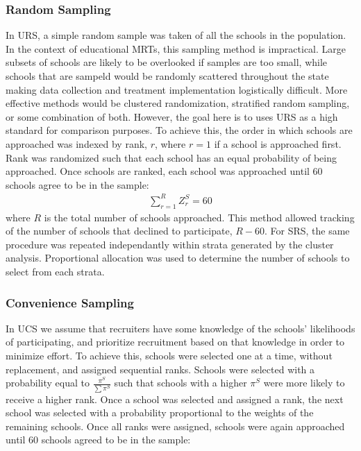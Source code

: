 \documentclass[man,floatsintext]{apa6}
\theoremstyle{definition}
\theoremstyle{definition}
\theoremstyle{definition}
\theoremstyle{remark}
\begin{document}
\hypertarget{random-sampling}{%
\subsubsection{Random Sampling}\label{random-sampling}}

In URS, a simple random sample was taken of all the schools in the
population. In the context of educational MRTs, this sampling method is
impractical. Large subsets of schools are likely to be overlooked if
samples are too small, while schools that are sampeld would be randomly
scattered throughout the state making data collection and treatment
implementation logistically difficult. More effective methods would be
clustered randomization, stratified random sampling, or some combination
of both. However, the goal here is to uses URS as a high standard for
comparison purposes. To achieve this, the order in which schools are
approached was indexed by rank, \(r\), where \(r = 1\) if a school is
approached first. Rank was randomized such that each school has an equal
probability of being approached. Once schools are ranked, each school
was approached until 60 schools agree to be in the sample:
\begin{align} \label{eq:rankRS}
  \sum_{r=1}^R{Z^S_r} = 60
\end{align} where \(R\) is the total number of schools approached. This
method allowed tracking of the number of schools that declined to
participate, \(R - 60\). For SRS, the same procedure was repeated
independantly within strata generated by the cluster analysis.
Proportional allocation was used to determine the number of schools to
select from each strata.

\hypertarget{convenience-sampling}{%
\subsubsection{Convenience Sampling}\label{convenience-sampling}}

In UCS we assume that recruiters have some knowledge of the schools'
likelihoods of participating, and prioritize recruitment based on that
knowledge in order to minimize effort. To achieve this, schools were
selected one at a time, without replacement, and assigned sequential
ranks. Schools were selected with a probability equal to
\(\frac{\pi^S}{\sum\pi^S}\) such that schools with a higher \(\pi^S\)
were more likely to receive a higher rank. Once a school was selected
and assigned a rank, the next school was selected with a probability
proportional to the weights of the remaining schools. Once all ranks
were assigned, schools were again approached until 60 schools agreed to
be in the sample:
\end{document}
